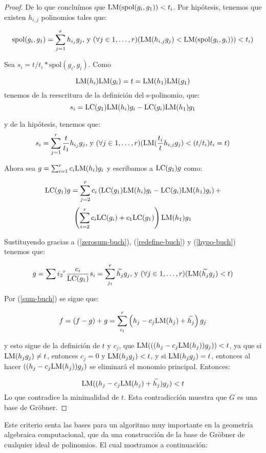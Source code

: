 \begin{proof}
De lo que concluímos que $\textrm{LM}(\textrm{spol}(g_i,g_1))< t_i$. Por hipótesis, tenemos que existen $h_{i,j}$ polinomios tales que:

$$\textrm{spol}(g_i,g_1) = \sum_{j=1}^r h_{i_j}g_j \textrm{, y }(\forall j \in 1,\dots,r)( \textrm{LM}(h_{i,j}g_j) < \textrm{LM}(\textrm{spol}(g_i,g_i))) < t_i)$$

Sea $s_i = t/t_i*\textrm{spol}(g_i,g_i)$. Como

$$\textrm{LM}(h_i)\textrm{LM}(g_i) = t = \textrm{LM}(h_1)\textrm{LM}(g_1)$$
tenemos de la reescritura de la definición del s-polinomio, que:
\begin{equation}\label{redefine-buch}
s_i = \textrm{LC}(g_1)\textrm{LM}(h_i)g_i - \textrm{LC}(g_i)\textrm{LM}(h_1)g_1
\end{equation}

y de la hipótesis, tenemos que:
\begin{equation}\label{hypo-buch}
s_i = \sum_{j=1}^r \frac{t}{t_1} h_{i_j}g_j \textrm{, y }(\forall j \in 1,\dots,r)( \textrm{LM}(\frac{t_i}{t}h_{i,j}g_j) < (t/t_i)t_i = t)
\end{equation}

Ahora sea $g = \sum_{i=1}^rc_i\textrm{LM}(h_i)g_i$ y escribamos a $\textrm{LC}(g_1)g$ como:

$$\textrm{LC}(g_1)g = \sum_{j=2}^rc_i\left(\textrm{LC}(g_1)\textrm{LM}(h_i)g_i - \textrm{LC}(g_i)\textrm{LM}(h_1)g_i\right) +$$ $$\left(\sum_{i=2}^rc_i\textrm{LC}(g_i)+c_1\textrm{LC}(g_1)\right)\textrm{LM}(h_1)g_1$$

Sustituyendo gracias a (\ref{zerosum-buch}), (\ref{redefine-buch}) y (\ref{hypo-buch}) tenemos que:

$$g = \sum{i_2}^r\frac{c_i}{\textrm{LC}(g_1)}s_i = \sum_{j_1}^r\widetilde{h_j}g_j \textrm{, y }(\forall j \in 1,\dots,r)( \textrm{LM}(\widetilde{h_{j}}g_j) <  t) $$

Por (\ref{sum-buch}) se sigue que:

$$f = (f-g) + g = \sum_{i_1}^r\left(h_j - c_j\textrm{LM}(h_j) + \widetilde{h_j}\right)g_j$$

y esto sigue de la definición de $t$ y $c_j$, que $\textrm{LM}(((h_j - c_j\textrm{LM}(h_j))g_j)) < t$, ya que si $\textrm{LM}(h_jg_j) \neq t$, entonces $c_j = 0$ y $\textrm{LM}(h_jg_j) < t$, y si $\textrm{LM}(h_jg_j) = t$, entonces al hacer 
$((h_j - c_j\textrm{LM}(h_j))g_j)$ se eliminará el monomio principal. Entonces:

$$ \textrm{LM}((h_j - c_j\textrm{LM}(h_j) + \widetilde{h_j})g_j) < t $$
Lo que contradice la minimalidad de $t$. Esta contradicción muestra que $G$ es una base de Gröbner.
\end{proof}

Este criterio senta las bases para un algoritmo muy importante en la geometría algebraica computacional, que da una construcción de la base de Gröbner de cualquier ideal de polinomios. El cual mostramos a continuación:

